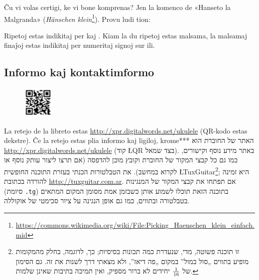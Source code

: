 Ĉu vi volas certigi, ke vi bone komprenas? Jen la komenco de «Hanseto la Malgranda» (\emph{Hänschen klein}\footnote{\url{https://commons.wikimedia.org/wiki/File:Picking_Haenschen_klein_einfach.mid}}). Provu ludi tion:

\begin{center}
\end{center}

Ripetoj estas indikitaj per  kaj . Kiam la du ripetoj estas malsama, la malsamaj finaĵoj estas indikitaj per numeritaj  signoj sur ili.



\subsection*{Informo kaj kontaktimformo}

\begin{figure}\vspace{-\baselineskip}\includegraphics[width=1.5cm]{retejo.png}\end{figure}
	La retejo de la libreto estas \url{http://xpr.digitalwords.net/ukulele} (QR-kodo estas dekstre). Ĉe la retejo estas plia informo kaj ligiloj, krome***
האתר של החוברת הוא \url{http://xpr.digitalwords.net/ukulele} (קוד \L{QR} בצד שמאל). באתר מידע נוסף וקישורים, כמו גם כל קבצי המקור של החוברת וקובץ מוכן להדפסה (אם תרצו ליצור עותק נוסף או לקרוא במחשב). את הטבלטורות הכנתי בעזרת התוכנה החופשית \L{TuxGuitar}\footnote{זו תוכנה פשוטה, מדי, שנעדרת כמה תכונות בסיסיות; כך, לדוגמה, בחלק מהמקומות מופיע בתווים „סול במול” במקום „פה דיאז”, ולא מצאתי דרך לשנות את זה. גם הסימון של ${1}\over{16}$ יחידים לא ברור מספיק, ואין תמיכה בתיבות שאינן שלמות.}; היא זמינה להורדה בכתובת \url{http://tuxguitar.com.ar}. אם תפתחו את קבצי המקור של המנגינות (סיומת \texttt{.tg}) בתוכנה הזאת תוכלו לשמוע אותן כשבזמן אמת מסומן המקום המתאים בטבלטורה ובתווים, כמו גם אופן הנגינה על ציור סכימטי של אוקוללה.

